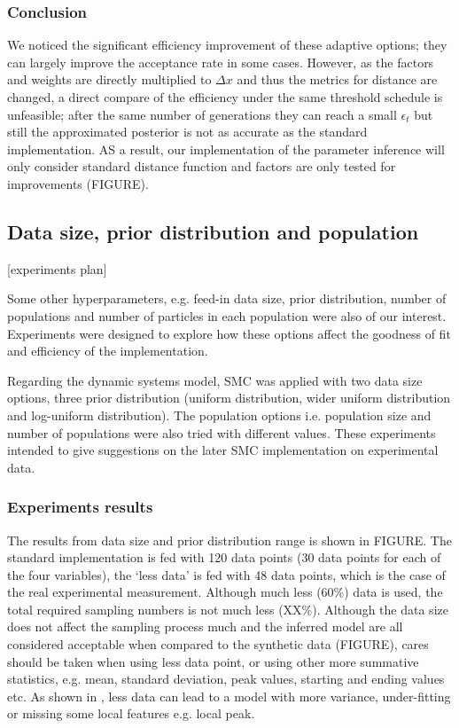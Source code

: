 \subsubsection{Conclusion} We noticed the significant efficiency improvement of these adaptive options; they can largely improve the acceptance rate in some cases. However, as the factors and weights are directly multiplied to $\Delta x$ and thus the metrics for distance are changed, a direct compare of the efficiency under the same threshold schedule is unfeasible; after the same number of generations they can reach a small $\epsilon_t$ but still the approximated posterior is not as accurate as the standard implementation. AS a result, our implementation of the parameter inference will only consider standard distance function and factors are only tested for improvements (FIGURE).


\subsection{Data size, prior distribution and population}

[experiments plan]

Some other hyperparameters, e.g. feed-in data size, prior distribution, number of populations and number of particles in each population were also of our interest. Experiments were designed to explore how these options affect the goodness of fit and efficiency of the implementation.

Regarding the dynamic systems model, SMC was applied with two data size options, three prior distribution (uniform distribution, wider uniform distribution and log-uniform distribution). The population options i.e. population size and number of populations were also tried with different values. These experiments intended to give suggestions on the later SMC implementation on experimental data.

\subsubsection{Experiments results}

The results from data size and prior distribution range is shown in FIGURE. The standard implementation is fed with 120 data points (30 data points for each of the four variables), the `less data' is fed with 48 data points, which is the case of the real experimental measurement. Although much less (60\%) data is used, the total required sampling numbers is not much less (XX\%). Although the data size does not affect the sampling process much and the inferred model are all considered acceptable when compared to the synthetic data (FIGURE), cares should be taken when using less data point, or using other more summative statistics, e.g. mean, standard deviation, peak values, starting and ending values etc. As shown in \cite{ref:disease}, less data can lead to a model with more variance, under-fitting or missing some local features e.g. local peak.

